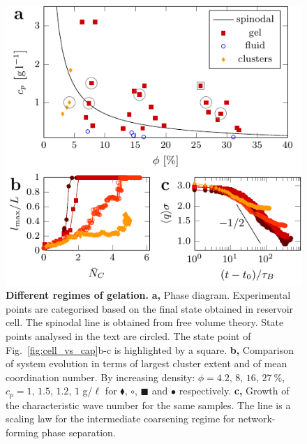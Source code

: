 \documentclass[preprint,footinbib,amsmath,amssymb]{revtex4}
\begin{document}
\clearpage 
\begin{figure}
\includegraphics{figs/phasediag.pdf}
\caption{\textbf{Different regimes of gelation.} \textbf{a,} Phase diagram. Experimental points are categorised based on the final state obtained in reservoir cell. The spinodal line is obtained from free volume theory. State points analysed in the text are circled. The state point of Fig.~\ref{fig:cell_vs_cap}b-c is highlighted by a square. \textbf{b,} Comparison of system evolution in terms of largest cluster extent and of mean coordination number. By increasing density: $\phi=4.2,\,8,\,16,\,27~\%$, $c_p=1,\,1.5,\,1.2,\, 1$ g/$\ell$ for 
{$\blacklozenge$}, 
{$\circ$}, 
{\tiny$\blacksquare$} and 
{$\bullet$} respectively. \textbf{c,} Growth of the characteristic wave number for the same samples. 
The line is a scaling law for the intermediate coarsening regime for network-forming phase separation.}
\label{fig:phasediag}
\end{figure}
\end{document}
